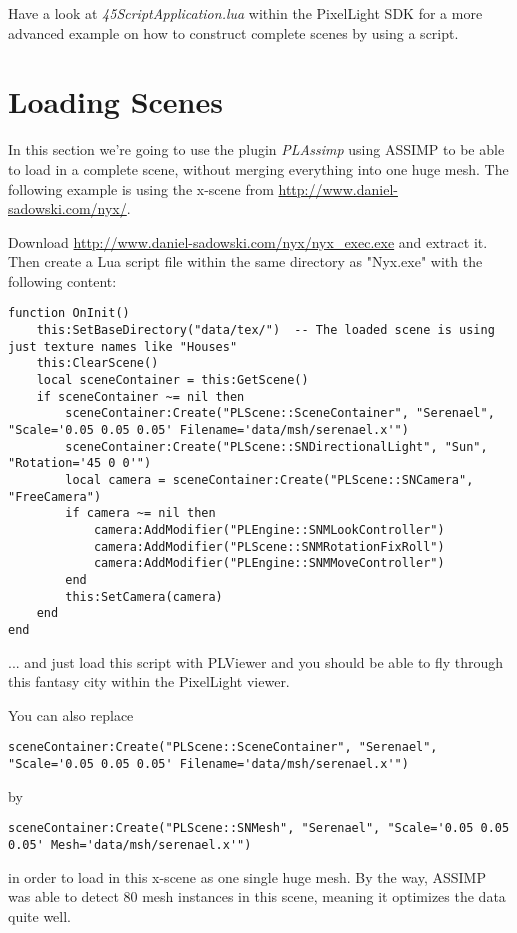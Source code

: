 Have a look at \emph{45ScriptApplication.lua} within the PixelLight \ac{SDK} for a more advanced example on how to construct complete scenes by using a script.




\section{Loading Scenes}
In this section we're going to use the plugin \emph{PLAssimp} using \ac{ASSIMP} to be able to load in a complete scene, without merging everything into one huge mesh. The following example is using the x-scene from \url{http://www.daniel-sadowski.com/nyx/}.

Download \url{http://www.daniel-sadowski.com/nyx/nyx_exec.exe} and extract it. Then create a Lua script file within the same directory as "Nyx.exe" with the following content:
\begin{lstlisting}
function OnInit()
	this:SetBaseDirectory("data/tex/")	-- The loaded scene is using just texture names like "Houses"
	this:ClearScene()
	local sceneContainer = this:GetScene()
	if sceneContainer ~= nil then
		sceneContainer:Create("PLScene::SceneContainer", "Serenael", "Scale='0.05 0.05 0.05' Filename='data/msh/serenael.x'")
		sceneContainer:Create("PLScene::SNDirectionalLight", "Sun", "Rotation='45 0 0'")
		local camera = sceneContainer:Create("PLScene::SNCamera", "FreeCamera")
		if camera ~= nil then
			camera:AddModifier("PLEngine::SNMLookController")
			camera:AddModifier("PLScene::SNMRotationFixRoll")
			camera:AddModifier("PLEngine::SNMMoveController")
		end
		this:SetCamera(camera)
	end
end
\end{lstlisting}
... and just load this script with PLViewer and you should be able to fly through this fantasy city within the PixelLight viewer.

You can also replace
\begin{lstlisting}
sceneContainer:Create("PLScene::SceneContainer", "Serenael", "Scale='0.05 0.05 0.05' Filename='data/msh/serenael.x'")
\end{lstlisting}
by
\begin{lstlisting}
sceneContainer:Create("PLScene::SNMesh", "Serenael", "Scale='0.05 0.05 0.05' Mesh='data/msh/serenael.x'")
\end{lstlisting}
in order to load in this x-scene as one single huge mesh. By the way, \ac{ASSIMP} was able to detect 80 mesh instances in this scene, meaning it optimizes the data quite well.

